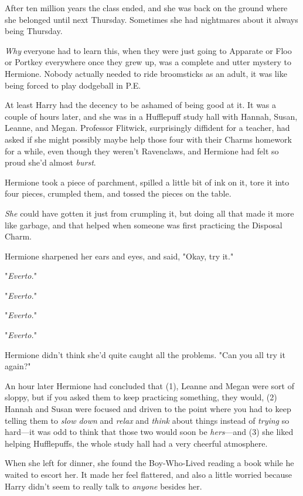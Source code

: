 After ten million years the class ended, and she was back on the ground where
she belonged until next Thursday. Sometimes she had nightmares about it always
being Thursday.

\emph{Why} everyone had to learn this, when they were just going to Apparate or
Floo or Portkey everywhere once they grew up, was a complete and utter mystery
to Hermione. Nobody actually needed to ride broomsticks as an adult, it was
like being forced to play dodgeball in P.E.

At least Harry had the decency to be ashamed of being good at it.
\sbreak
It was a couple of hours later, and she was in a Hufflepuff study hall with
Hannah, Susan, Leanne, and Megan. Professor Flitwick, surprisingly diffident
for a teacher, had asked if she might possibly maybe help those four with their
Charms homework for a while, even though they weren't Ravenclaws, and Hermione
had felt so proud she'd almost \emph{burst}.

Hermione took a piece of parchment, spilled a little bit of ink on it, tore it
into four pieces, crumpled them, and tossed the pieces on the table.

\emph{She} could have gotten it just from crumpling it, but doing all that made
it more like garbage, and that helped when someone was first practicing the
Disposal Charm.

Hermione sharpened her ears and eyes, and said, "Okay, try it."

"\emph{Everto.}"

"\emph{Everto.}"

"\emph{Everto.}"

"\emph{Everto.}"

Hermione didn't think she'd quite caught all the problems. "Can you all try it
again?"

An hour later Hermione had concluded that (1), Leanne and Megan were sort of
sloppy, but if you asked them to keep practicing something, they would, (2)
Hannah and Susan were focused and driven to the point where you had to keep
telling them to \emph{slow down} and \emph{relax} and \emph{think} about things
instead of \emph{trying} so hard---it was odd to think that those two would
soon be \emph{hers}---and (3) she liked helping Hufflepuffs, the whole study
hall had a very cheerful atmosphere.

When she left for dinner, she found the Boy-Who-Lived reading a book while he
waited to escort her. It made her feel flattered, and also a little worried
because Harry didn't seem to really talk to \emph{anyone} besides her.

